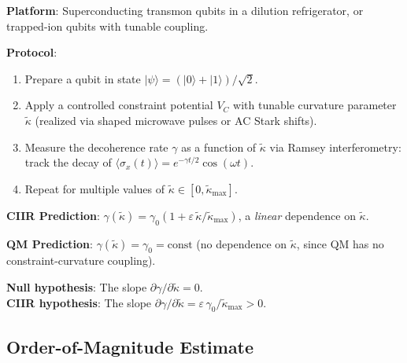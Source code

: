 \begin{definition}\label{def:12.19}
\textbf{Platform}: Superconducting transmon qubits in a dilution
refrigerator, or trapped-ion qubits with tunable coupling.

\textbf{Protocol}:
\begin{enumerate}
  \item Prepare a qubit in state $|\psi\rangle = (|0\rangle + |1\rangle)/\sqrt{2}$.
  \item Apply a controlled constraint potential $V_C$ with tunable curvature
    parameter $\tilde{\kappa}$ (realized via shaped microwave pulses or
    AC Stark shifts).
  \item Measure the decoherence rate $\gamma$ as a function of $\tilde{\kappa}$
    via Ramsey interferometry: track the decay of $\langle\sigma_x(t)\rangle
    = e^{-\gamma t/2}\cos(\omega t)$.
  \item Repeat for multiple values of $\tilde{\kappa} \in [0, \tilde{\kappa}_{\max}]$.
\end{enumerate}

\textbf{CIIR Prediction}: $\gamma(\tilde{\kappa}) = \gamma_0(1 + \varepsilon\,\tilde{\kappa}/\tilde{\kappa}_{\max})$,
a \emph{linear} dependence on $\tilde{\kappa}$.

\textbf{QM Prediction}: $\gamma(\tilde{\kappa}) = \gamma_0 = \mathrm{const}$
(no dependence on $\tilde{\kappa}$, since QM has no constraint-curvature
coupling).

\textbf{Null hypothesis}: The slope $\partial\gamma/\partial\tilde{\kappa} = 0$.\\
\textbf{CIIR hypothesis}: The slope $\partial\gamma/\partial\tilde{\kappa}
= \varepsilon\,\gamma_0 / \tilde{\kappa}_{\max} > 0$.
\end{definition}

\subsection{Order-of-Magnitude Estimate}

